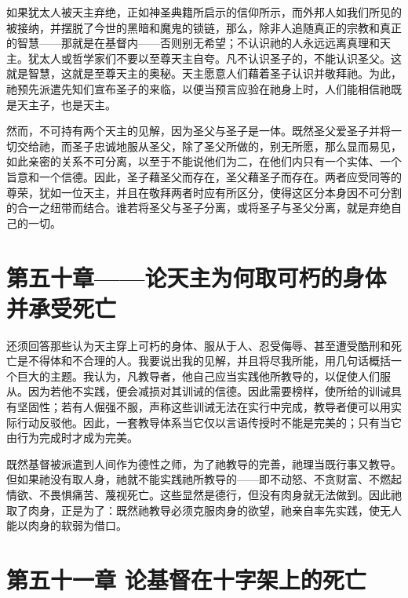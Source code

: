 如果犹太人被天主弃绝，正如神圣典籍所启示的信仰所示，而外邦人如我们所见的被接纳，并摆脱了今世的黑暗和魔鬼的锁链，那么，除非人追随真正的宗教和真正的智慧——那就是在基督内——否则别无希望；不认识祂的人永远远离真理和天主。犹太人或哲学家们不要以至尊天主自夸。凡不认识圣子的，不能认识圣父。这就是智慧，这就是至尊天主的奥秘。天主愿意人们藉着圣子认识并敬拜祂。为此，祂预先派遣先知们宣布圣子的来临，以便当预言应验在祂身上时，人们能相信祂既是天主子，也是天主。\par

然而，不可持有两个天主的见解，因为圣父与圣子是一体。既然圣父爱圣子并将一切交给祂，而圣子忠诚地服从圣父，除了圣父所做的，别无所愿，那么显而易见，如此亲密的关系不可分离，以至于不能说他们为二，在他们内只有一个实体、一个旨意和一个信德。因此，圣子藉圣父而存在，圣父藉圣子而存在。两者应受同等的尊荣，犹如一位天主，并且在敬拜两者时应有所区分，使得这区分本身因不可分割的合一之纽带而结合。谁若将圣父与圣子分离，或将圣子与圣父分离，就是弃绝自己的一切。\par


\section{第五十章——论天主为何取可朽的身体并承受死亡}

还须回答那些认为天主穿上可朽的身体、服从于人、忍受侮辱、甚至遭受酷刑和死亡是不得体和不合理的人。我要说出我的见解，并且将尽我所能，用几句话概括一个巨大的主题。我认为，凡教导者，他自己应当实践他所教导的，以促使人们服从。因为若他不实践，便会减损对其训诫的信德。因此需要榜样，使所给的训诫具有坚固性；若有人倔强不服，声称这些训诫无法在实行中完成，教导者便可以用实际行动反驳他。因此，一套教导体系当它仅以言语传授时不能是完美的；只有当它由行为完成时才成为完美。\par

既然基督被派遣到人间作为德性之师，为了祂教导的完善，祂理当既行事又教导。但如果祂没有取人身，祂就不能实践祂所教导的——即不动怒、不贪财富、不燃起情欲、不畏惧痛苦、蔑视死亡。这些显然是德行，但没有肉身就无法做到。因此祂取了肉身，正是为了：既然祂教导必须克服肉身的欲望，祂亲自率先实践，使无人能以肉身的软弱为借口。\par


\section{第五十一章 论基督在十字架上的死亡}

